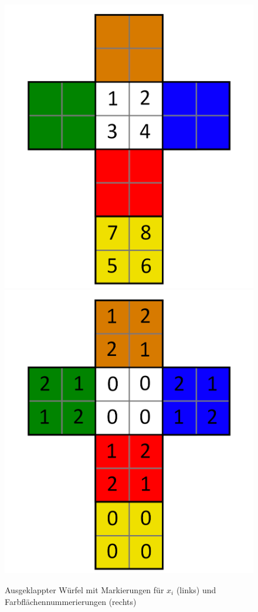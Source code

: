 \documentclass[12pt,a4paper, usenames, dvipsnames]{article}
\theoremstyle{mystyle}
\theoremstyle{definition}
\begin{document}
\begin{figure}[H]
\centering
\includegraphics[scale=0.13]{foldedout_numbers.png}
\includegraphics[scale=0.13]{foldedout_012.png}
\caption[Markierungen $x_i$ (links), Farbflächennummern (rechts)]{Ausgeklappter Würfel mit Markierungen für $x_i$ (links) und Farbflächennummerierungen (rechts) }
\end{figure}
\end{document}
